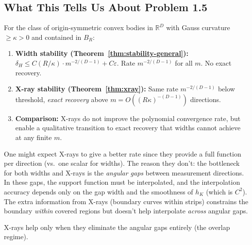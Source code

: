 \subsection{What This Tells Us About Problem 1.5}

\begin{corollary}
\label{cor:problem15}
For the class of origin-symmetric convex bodies in $\mathbb{R}^D$ with Gauss curvature $\geq \kappa > 0$ and contained in $B_R$:

\begin{enumerate}
  \item \textbf{Width stability (Theorem~\ref{thm:stability-general}):} $\delta_H \leq C(R/\kappa) \cdot m^{-2/(D-1)} + C\varepsilon$. Rate $m^{-2/(D-1)}$ for all $m$. No exact recovery.
  
  \item \textbf{X-ray stability (Theorem~\ref{thm:xray}):} Same rate $m^{-2/(D-1)}$ below threshold, \emph{exact recovery} above $m = O((R\kappa)^{-(D-1)})$ directions.
  
  \item \textbf{Comparison:} X-rays do not improve the polynomial convergence rate, but enable a qualitative transition to exact recovery that widths cannot achieve at any finite $m$.
\end{enumerate}
\end{corollary}

\begin{remark}
One might expect X-rays to give a better rate since they provide a full function per direction (vs.\ one scalar for widths). The reason they don't: the bottleneck for both widths and X-rays is the \emph{angular gaps} between measurement directions. In these gaps, the support function must be interpolated, and the interpolation accuracy depends only on the gap width and the smoothness of $h_K$ (which is $C^2$). The extra information from X-rays (boundary curves within strips) constrains the boundary \emph{within} covered regions but doesn't help interpolate \emph{across} angular gaps.

X-rays help only when they eliminate the angular gaps entirely (the overlap regime).
\end{remark}

